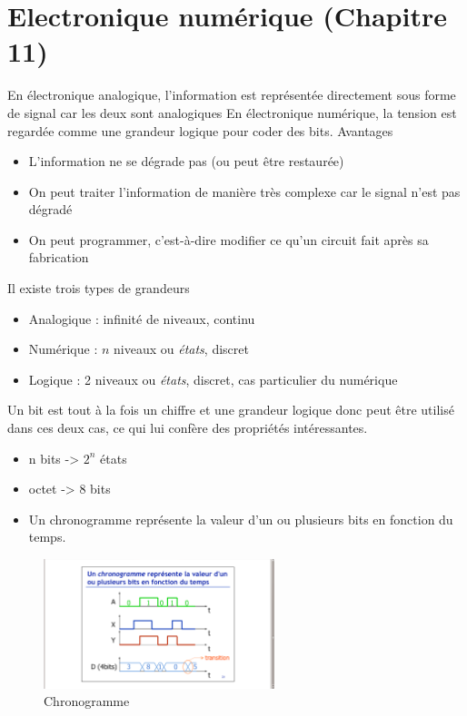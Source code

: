 \documentclass[a4paper]{article}
\begin{document}
\section{Electronique numérique (Chapitre 11)}
    En électronique analogique, l'information est représentée directement sous forme de signal car les deux sont analogiques
    En électronique numérique, la tension est regardée comme une grandeur logique pour coder des bits.
    Avantages
    \begin{itemize}
        \item L'information ne se dégrade pas (ou peut être restaurée)
        \item On peut traiter l'information de manière très complexe car le signal n'est pas dégradé
        \item On peut programmer, c'est-à-dire modifier ce qu'un circuit fait après sa fabrication
    \end{itemize}
    Il existe trois types de grandeurs
    \begin{itemize}
        \item Analogique : infinité de niveaux, continu
        \item Numérique : $n$ niveaux ou \textit{états}, discret
        \item Logique : 2 niveaux ou \textit{états}, discret, cas particulier du numérique
    \end{itemize}
    Un bit est tout à la fois un chiffre et une grandeur logique donc peut être utilisé dans ces deux cas, ce qui lui confère des propriétés intéressantes.
    \begin{itemize}
        \item n bits -> $ 2^{n} $ états
        \item octet -> 8 bits
        \item Un chronogramme représente la valeur d'un ou plusieurs bits en fonction du temps.
    \end{itemize}
    \begin{figure}[H]
        \begin{center}
            \includegraphics[width=0.6\textwidth]{fig/11_chronogramme.png}
            \caption{Chronogramme}
            \label{fig:5_octocoupleur}
        \end{center}
    \end{figure}
\end{document}
